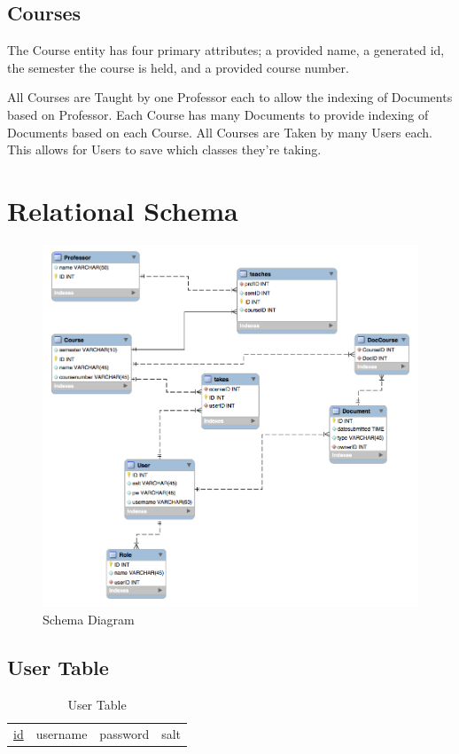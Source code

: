 \documentclass[11pt]{article}
\begin{document}
\subsection{Courses}
\label{sec-2-6}


   The Course entity has four primary attributes; a provided name, a
   generated id, the semester the course is held, and a provided
   course number.

   All Courses are Taught by one Professor each to allow the indexing of
   Documents based on Professor. Each Course has many Documents to
   provide indexing of Documents based on each Course. All Courses
   are Taken by many Users each. This allows for Users to save which
   classes they're taking.
\section{Relational Schema}
\label{sec-3}


  \begin{figure}[htb]
  \centering
  \includegraphics[width=.9\linewidth]{Schema.png}
  \caption{Schema Diagram}
  \end{figure}
\subsection{User Table}
\label{sec-3-1}


\begin{table}[htb]
\caption{User Table} 
\begin{center}
\begin{tabular}{l|l|l|l}
 \underline{id}  &  username  &  password  &  salt  \\
\end{tabular}
\end{center}
\end{table}
\end{document}
